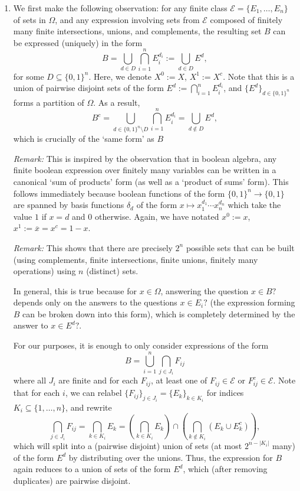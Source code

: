 \documentclass[11pt]{article}
\begin{document}
\begin{enumerate}
        \item We first make the following observation: for any finite class
        $\mathcal{E} = \{E_1, \dots, E_n\}$ of sets in $\Omega$, and any
        expression involving sets from $\mathcal{E}$ composed of finitely many
        finite intersections, unions, and complements, the resulting set $B$
        can be expressed (uniquely) in the form \[
            B = \bigcup_{d \in D} \bigcap_{i = 1}^n E_i^{d_i} := \bigcup_{d \in D} E^d, \tag{1.2.1}
        \] for some $D \subseteq \{0, 1\}^n$.
        Here, we denote $X^0 := X$, $X^1 := X^c$.
        Note that this is a union of pairwise disjoint sets of the form $E^d
        := \bigcap_{i = 1}^n E_i^{d_i}$, and $\{E^d\}_{d \in \{0, 1\}^n}$
        forms a partition of $\Omega$.
        As a result, \[
            B^c = \bigcup_{d \in \{0, 1\}^n \setminus D} \bigcap_{i = 1}^n E_i^{d_i} = \bigcup_{d \notin D} E^d, \tag{1.2.2}
        \] which is crucially of the `same form' as $B$

        \emph{Remark:} This is inspired by the observation that in boolean
        algebra, any finite boolean expression over finitely many variables
        can be written in a canonical `sum of products' form (as well as a
        `product of sums' form).
        This follows immediately because boolean functions of the form $\{0,
        1\}^n \to \{0, 1\}$ are spanned by basis functions $\delta_d$ of the
        form $x \mapsto x_1^{d_1}\cdots x_n^{d_n}$ which take the value $1$ if
        $x = d$ and $0$ otherwise.
        Again, we have notated $x^0 := x$, $x^1 := \overline{x} = x^c = 1 -
        x$.

        \emph{Remark:} This shows that there are precisely $2^n$ possible sets
        that can be built (using complements, finite intersections, finite
        unions, finitely many operations) using $n$ (distinct) sets.

        In general, this is true because for $x \in \Omega$, answering the
        question $x \in B?$ depends only on the answers to the questions $x
        \in E_i?$ (the expression forming $B$ can be broken down into this
        form), which is completely determined by the answer to $x \in E^d?$.

        For our purposes, it is enough to only consider expressions of the
        form \[
           B =  \bigcup_{i = 1}^n \bigcap_{j \in J_i} F_{ij}
        \] where all $J_i$ are finite and for each $F_{ij}$, at least one of
        $F_{ij} \in \mathcal{E}$ or $F_{ij}^c \in \mathcal{E}$.
        Note that for each $i$, we can relabel $\{F_{ij}\}_{j \in J_i} =
        \{E_k\}_{k \in K_i}$ for indices $K_i \subseteq \{1, \dots, n\}$, and
        rewrite \[
            \bigcap_{j \in J_i} F_{ij}
                = \bigcap_{k \in K_i} E_k
                = \left(\bigcap_{k \in K_i} E_k\right) \cap \left(\bigcap_{k \notin K_i} (E_k \cup E_k^c)\right),
        \] which will split into a (pairwise disjoint) union of sets (at most
        $2^{n - |K_i|}$ many) of the form $E^d$ by distributing over the
        unions.
        Thus, the expression for $B$ again reduces to a union of sets of the
        form $E^d$, which (after removing duplicates) are pairwise disjoint.



\end{enumerate}
\end{document}
